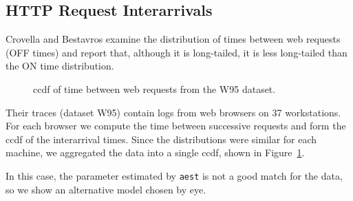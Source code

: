 \documentclass{elsart}
\begin{document}




\subsection{HTTP Request Interarrivals}

Crovella and Bestavros \cite{CrovellaBestavros95} examine the
distribution of times between web requests (OFF times) and report
that, although it is long-tailed, it is less long-tailed than the ON
time distribution.

\begin{figure}[tb]
\centerline{}
\caption{ccdf of time between web requests from the W95 dataset.}
\label{fig.crovella.inter}
\end{figure}

Their traces (dataset W95) contain logs from web browsers on 37
workstations.  For each browser we compute the time between successive
requests and form the ccdf of the interarrival times.  Since the
distributions were similar for each machine, we aggregated the data
into a single ccdf, shown in Figure~\ref{fig.crovella.inter}.

In this case, the parameter estimated by {\tt aest} is not a good
match for the data, so we show an alternative model chosen by eye.
\end{document}
